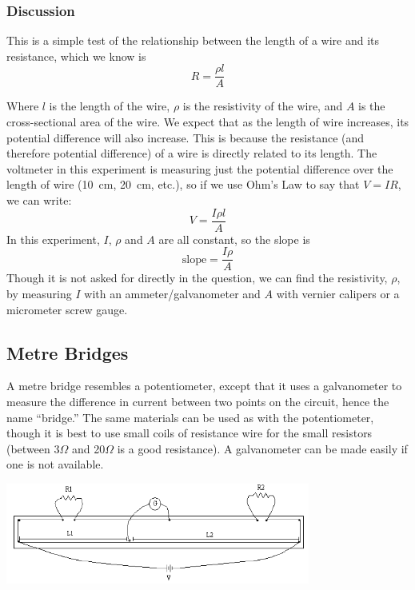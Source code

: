 \subsubsection{Discussion}

This is a simple test of the relationship between the length of a wire and its
resistance, which we know is $$R=\frac{\rho l}{A} $$

Where $l$ is the length of the wire, $\rho$ is the resistivity of the wire, and $A$ is the cross-sectional
area of the wire. We expect that as the length of wire increases, its potential difference
will also increase. This is because the resistance (and therefore potential difference) of a wire is
directly related to its length. The voltmeter in this experiment is measuring just the
potential difference over the length of wire (10~cm, 20~cm, etc.), so if we use Ohm’s Law to say that $V = IR$, we can write:\\
$$ V = \frac{I \rho l}{A} $$
In this experiment, $I$, $\rho$ and $A$ are all constant, so the slope is
$$\mathrm{slope} = \frac{I \rho}{A} $$
Though it is not asked for directly in the question, we can find the resistivity, $\rho$, by measuring $I$ with an ammeter/galvanometer and $A$ with vernier calipers or a micrometer screw gauge.

\subsection{Metre Bridges}  

A metre bridge resembles a potentiometer, except that it uses a galvanometer to
measure the difference in current between two points on the circuit, hence the name
``bridge.'' The same materials can be used as with the potentiometer, though it is best to
use small coils of resistance wire for the small resistors (between 3$\Omega$ and 20$\Omega$ is a good resistance). A galvanometer can be made easily if one is not available.

\begin{center}
\includegraphics[width=10cm]{./img/meter-bridge-2.png}
\end{center}

